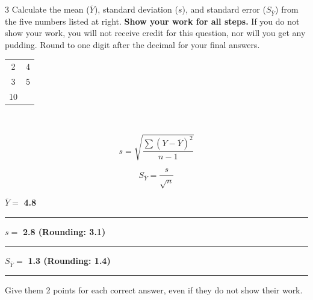 \showpoints

\question[10]
\begin{multicols}{3}
Calculate the mean ($\overline{Y}$), standard deviation ($s$), and standard error ($S_{\overline{Y}}$) from the five numbers listed at right. \textbf{Show your work for all steps.} If you do not show your work, you will not receive credit for this question, nor will you get any pudding. Round to one digit after the decimal for your final answers.

\columnbreak

\hfill\begin{tabular}{@{}cc@{}}
\toprule
2	& 4\\
3	& 5\\
10	& \\
\bottomrule
\end{tabular}\hfill\

\[s = \sqrt{\frac{\sum{(Y-\overline{Y})^2}}{n-1}}\]

\[S_{\overline{Y}} = \dfrac{s}{\sqrt{n}}\]

\columnbreak

$\overline{Y}=$ \ifprintanswers\textbf{4.8}\else\rule{0.75in}{0.4pt}\fi

\vspace*{2\baselineskip}

 $s = $ \ifprintanswers\textbf{2.8 (Rounding: 3.1)}\else\rule{0.75in}{0.4pt}\fi

\vspace*{2\baselineskip}

$S_{\overline{Y}} = $ \ifprintanswers\textbf{1.3 (Rounding: 1.4)}\else\rule{0.75in}{0.4pt}\fi

\end{multicols}

\begin{solution}

Give them 2 points for each correct answer, even if they do not show their work. 

\end{solution}